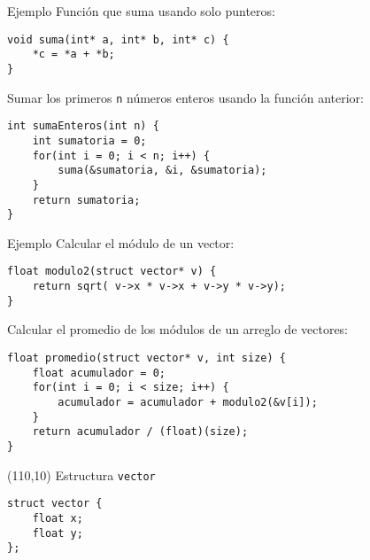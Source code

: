 \documentclass[aspectratio=169]{beamer}
\begin{document}
\begin{frame}[fragile,t]{Ejemplo}
\small
\textcolor{verdeuca}{Función que suma usando solo punteros:}
\begin{verbatim}
void suma(int* a, int* b, int* c) {
    *c = *a + *b;
}
\end{verbatim}
\textcolor{verdeuca}{Sumar los primeros \texttt{n} números enteros usando la función anterior:}
\begin{verbatim}
int sumaEnteros(int n) {
    int sumatoria = 0;
    for(int i = 0; i < n; i++) {
        suma(&sumatoria, &i, &sumatoria);
    }
    return sumatoria;
}
\end{verbatim}
\end{frame}

\begin{frame}[fragile,t]{Ejemplo}
\small
\textcolor{verdeuca}{Calcular el módulo de un vector:}
\begin{verbatim}
float modulo2(struct vector* v) {
    return sqrt( v->x * v->x + v->y * v->y);
}
\end{verbatim}
\textcolor{verdeuca}{Calcular el promedio de los módulos de un arreglo de vectores:}
\begin{verbatim}
float promedio(struct vector* v, int size) {
    float acumulador = 0;
    for(int i = 0; i < size; i++) {
        acumulador = acumulador + modulo2(&v[i]);
    }
    return acumulador / (float)(size);
}
\end{verbatim}
\begin{textblock}{87}(110,10)
\footnotesize
\textcolor{verdeuca}{Estructura \texttt{vector}}
\begin{verbatim}
struct vector {
    float x;
    float y;
};
\end{verbatim}
\end{textblock}
\end{frame}
\end{document}
